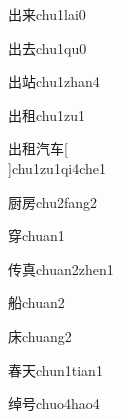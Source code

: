 \begin{verbete}[5;7]{出来}{chu1lai0}
\end{verbete}

\begin{verbete}[5;5]{出去}{chu1qu0}
\end{verbete}

\begin{verbete}[5;10]{出站}{chu1zhan4}
\end{verbete}

\begin{verbete}[5;10]{出租}{chu1zu1}
\end{verbete}

\begin{verbete}[5;10;7;4]{出租汽车}[\\]{chu1zu1qi4che1}
\end{verbete}

\begin{verbete}[12;8]{厨房}{chu2fang2}
\end{verbete}

\begin{verbete}[9]{穿}{chuan1}
\end{verbete}

\begin{verbete}[6;10]{传真}{chuan2zhen1}
\end{verbete}

\begin{verbete}[11]{船}{chuan2}
\end{verbete}

\begin{verbete}[7]{床}{chuang2}
\end{verbete}

\begin{verbete}[9;4]{春天}{chun1tian1}
\end{verbete}

\begin{verbete}[11;5]{绰号}{chuo4hao4}
\end{verbete}


